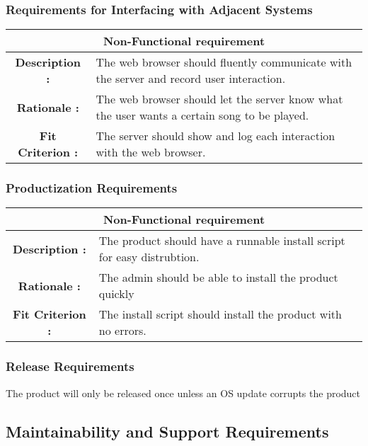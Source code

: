 \documentclass[12pt, titlepage]{article}
\begin{document}
\subsubsection{Requirements for Interfacing with Adjacent Systems}
\begin{center}
\begin{table}[H]
\begin{tabularx}{\textwidth}{| c X |}
\hline
\multicolumn{2}{|c|}{\textbf{Non-Functional requirement}}\\
\hline
\textbf{Description : } &The web browser should fluently communicate with the server and record user interaction.\\
\hline
\textbf{Rationale : } & The web browser should let the server know what the user wants a certain song to be played. \\
\hline
\textbf{Fit Criterion : } & The server should show and log each interaction with the web browser. \\
\hline
\end{tabularx}
\end{table}
\end{center}
\subsubsection{Productization Requirements}
\begin{center}
\begin{table}[H]
\begin{tabularx}{\textwidth}{| c X |}
\hline
\multicolumn{2}{|c|}{\textbf{Non-Functional requirement}}\\
\hline
\textbf{Description : } &The product should have a runnable install script for easy distrubtion.\\
\hline
\textbf{Rationale : } & The admin should be able to install the product quickly \\
\hline
\textbf{Fit Criterion : } & The install script should install the product with no errors. \\
\hline
\end{tabularx}
\end{table}
\end{center}
\subsubsection{Release Requirements}
The product will only be released once unless an OS update corrupts the product


\subsection{Maintainability and Support Requirements}
\end{document}
